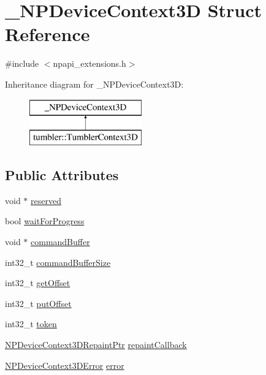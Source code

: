 \hypertarget{struct___n_p_device_context3_d}{
\section{\_\-NPDeviceContext3D Struct Reference}
\label{struct___n_p_device_context3_d}
}


{\ttfamily \#include $<$npapi\_\-extensions.h$>$}

Inheritance diagram for \_\-NPDeviceContext3D:\begin{figure}[H]
\begin{center}
\leavevmode
\includegraphics[height=2cm]{struct___n_p_device_context3_d}
\end{center}
\end{figure}
\subsection*{Public Attributes}
\begin{DoxyCompactItemize}
\item 
void $\ast$ \hyperlink{struct___n_p_device_context3_d_a98ffca8489323d94761d36927edbdc3c}{reserved}
\item 
bool \hyperlink{struct___n_p_device_context3_d_a652fa21fe68686fa83e81530d53e113e}{waitForProgress}
\item 
void $\ast$ \hyperlink{struct___n_p_device_context3_d_a92feeedd3fa2e4f14a9a0883e0883869}{commandBuffer}
\item 
int32\_\-t \hyperlink{struct___n_p_device_context3_d_af3d1a17e3a16355d530a2960d5167c7d}{commandBufferSize}
\item 
int32\_\-t \hyperlink{struct___n_p_device_context3_d_a94db0e726b7e3e3a421816ac896a8a51}{getOffset}
\item 
int32\_\-t \hyperlink{struct___n_p_device_context3_d_a95a001a05b4eb06f052a747f5521d2df}{putOffset}
\item 
int32\_\-t \hyperlink{struct___n_p_device_context3_d_a830ebfce87462205435ee2330f95b587}{token}
\item 
\hyperlink{npapi__extensions_8h_a619585c201cffd2cf885f5962c18acad}{NPDeviceContext3DRepaintPtr} \hyperlink{struct___n_p_device_context3_d_af5ba5d8f7cf171c710986a37dce757c8}{repaintCallback}
\item 
\hyperlink{npapi__extensions_8h_a906aa19cdf5fda7001f724a41118229a}{NPDeviceContext3DError} \hyperlink{struct___n_p_device_context3_d_a441e48d904459693f94a49f56ac9e419}{error}
\end{DoxyCompactItemize}


